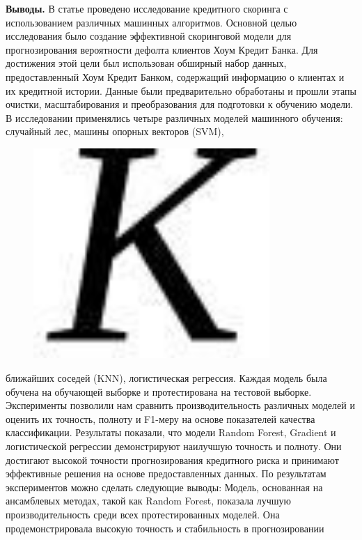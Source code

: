 {\bfseries Выводы.} В статье проведено исследование кредитного скоринга с
использованием различных машинных алгоритмов. Основной целью
исследования было создание эффективной скоринговой модели для
прогнозирования вероятности дефолта клиентов Хоум Кредит Банка. Для
достижения этой цели был использован обширный набор данных,
предоставленный Хоум Кредит Банком, содержащий информацию о клиентах и
\hspace{0pt}\hspace{0pt}их кредитной истории. Данные были предварительно
обработаны и прошли этапы очистки, масштабирования и преобразования для
подготовки к обучению модели. В исследовании применялись четыре
различных моделей машинного обучения: случайный лес, машины опорных
векторов (SVM), \begin{figure}[H]
	\centering
	\includegraphics[width=0.8\textwidth]{assets/125}
	\caption*{}
\end{figure}ближайших соседей
(KNN), логистическая регрессия. Каждая модель была обучена на обучающей
выборке и протестирована на тестовой выборке. Эксперименты позволили нам
сравнить производительность различных моделей и оценить их точность,
полноту и F1-меру на основе показателей качества классификации.
Результаты показали, что модели Random Forest, Gradient и логистической
регрессии демонстрируют наилучшую точность и полноту. Они достигают
высокой точности прогнозирования кредитного риска и принимают
эффективные решения на основе предоставленных данных. По результатам
экспериментов можно сделать следующие выводы: Модель, основанная на
ансамблевых методах, такой как Random Forest, показала лучшую
производительность среди всех протестированных моделей. Она
продемонстрировала высокую точность и стабильность в прогнозировании
